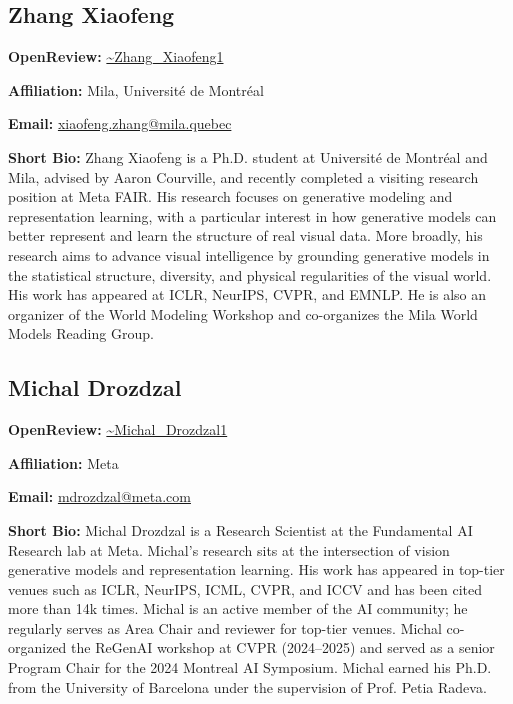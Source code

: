 \documentclass[11pt]{article}
\begin{document}
\subsection{Zhang Xiaofeng}

\textbf{OpenReview:} \href{https://openreview.net/profile?id=\string~Zhang\_Xiaofeng1}{\textasciitilde{}Zhang\_Xiaofeng1}


\textbf{Affiliation:} Mila, Université de Montréal


\textbf{Email:} \href{mailto:xiaofeng.zhang@mila.quebec}{xiaofeng.zhang@mila.quebec}


\textbf{Short Bio:} Zhang Xiaofeng is a Ph.D. student at Université de Montréal and Mila, advised by Aaron Courville, and recently completed a visiting research position at Meta FAIR. His research focuses on generative modeling and representation learning, with a particular interest in how generative models can better represent and learn the structure of real visual data. More broadly, his research aims to advance visual intelligence by grounding generative models in the statistical structure, diversity, and physical regularities of the visual world. His work has appeared at ICLR, NeurIPS, CVPR, and EMNLP. He is also an organizer of the World Modeling Workshop and co-organizes the Mila World Models Reading Group.


\subsection{Michal Drozdzal}

\textbf{OpenReview:} \href{https://openreview.net/profile?id=\string~Michal\_Drozdzal1}{\textasciitilde{}Michal\_Drozdzal1}


\textbf{Affiliation:} Meta


\textbf{Email:} \href{mailto:mdrozdzal@meta.com}{mdrozdzal@meta.com}


\textbf{Short Bio:} Michal Drozdzal is a Research Scientist at the Fundamental AI Research lab at Meta. Michal's research sits at the intersection of vision generative models and representation learning. His work has appeared in top-tier venues such as ICLR, NeurIPS, ICML, CVPR, and ICCV and has been cited more than 14k times. Michal is an active member of the AI community; he regularly serves as Area Chair and reviewer for top-tier venues. Michal co-organized the ReGenAI workshop at CVPR (2024--2025) and served as a senior Program Chair for the 2024 Montreal AI Symposium. Michal earned his Ph.D. from the University of Barcelona under the supervision of Prof. Petia Radeva.
\end{document}
